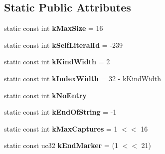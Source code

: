 \subsection*{Static Public Attributes}
\begin{DoxyCompactItemize}
\item 
\hypertarget{classv8_1_1internal_1_1_b_a_s_e___e_m_b_e_d_d_e_d_a2af78026c0356a81edeba9cd81aa5420}{}static const int {\bfseries k\+Max\+Size} = 16\label{classv8_1_1internal_1_1_b_a_s_e___e_m_b_e_d_d_e_d_a2af78026c0356a81edeba9cd81aa5420}

\item 
\hypertarget{classv8_1_1internal_1_1_b_a_s_e___e_m_b_e_d_d_e_d_a36be764c5b8742715ce0503621bb04b3}{}static const int {\bfseries k\+Self\+Literal\+Id} = -\/239\label{classv8_1_1internal_1_1_b_a_s_e___e_m_b_e_d_d_e_d_a36be764c5b8742715ce0503621bb04b3}

\item 
\hypertarget{classv8_1_1internal_1_1_b_a_s_e___e_m_b_e_d_d_e_d_ab1c8f443d2857c8f3750cd20287f6946}{}static const int {\bfseries k\+Kind\+Width} = 2\label{classv8_1_1internal_1_1_b_a_s_e___e_m_b_e_d_d_e_d_ab1c8f443d2857c8f3750cd20287f6946}

\item 
\hypertarget{classv8_1_1internal_1_1_b_a_s_e___e_m_b_e_d_d_e_d_a563b9073dcf597bed803b7aab2af336c}{}static const int {\bfseries k\+Index\+Width} = 32 -\/ k\+Kind\+Width\label{classv8_1_1internal_1_1_b_a_s_e___e_m_b_e_d_d_e_d_a563b9073dcf597bed803b7aab2af336c}

\item 
\hypertarget{classv8_1_1internal_1_1_b_a_s_e___e_m_b_e_d_d_e_d_aa5c10d78037a5f712ae259f8869f3f53}{}static const int {\bfseries k\+No\+Entry}\label{classv8_1_1internal_1_1_b_a_s_e___e_m_b_e_d_d_e_d_aa5c10d78037a5f712ae259f8869f3f53}

\item 
\hypertarget{classv8_1_1internal_1_1_b_a_s_e___e_m_b_e_d_d_e_d_ad9abeaca725931f118ad7917697d45e5}{}static const int {\bfseries k\+End\+Of\+String} = -\/1\label{classv8_1_1internal_1_1_b_a_s_e___e_m_b_e_d_d_e_d_ad9abeaca725931f118ad7917697d45e5}

\item 
\hypertarget{classv8_1_1internal_1_1_b_a_s_e___e_m_b_e_d_d_e_d_a91977245be3d8e520e857bf1e8a4e402}{}static const int {\bfseries k\+Max\+Captures} = 1 $<$$<$ 16\label{classv8_1_1internal_1_1_b_a_s_e___e_m_b_e_d_d_e_d_a91977245be3d8e520e857bf1e8a4e402}

\item 
\hypertarget{classv8_1_1internal_1_1_b_a_s_e___e_m_b_e_d_d_e_d_ab0489b2e3bda2b5c5e585405f4c58f6f}{}static const uc32 {\bfseries k\+End\+Marker} = (1 $<$$<$ 21)\label{classv8_1_1internal_1_1_b_a_s_e___e_m_b_e_d_d_e_d_ab0489b2e3bda2b5c5e585405f4c58f6f}


\end{DoxyCompactItemize}

